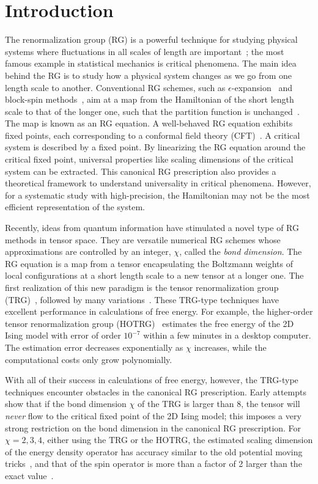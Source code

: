 \documentclass[aps,prr,reprint,superscriptaddress,nofootinbib,floatfix]{revtex4-2}
\begin{document}
\section{Introduction\label{intro}}
The renormalization group (RG) is a powerful technique for studying physical systems where fluctuations in all scales of length are important~\cite{wilsonNobel}; the most famous example in statistical mechanics is critical phenomena.
The main idea behind the RG is to study how a physical system changes as we go from one length scale to another.
Conventional RG schemes, such as $\epsilon$-expansion~\cite{wilson1972} and block-spin methods~\cite{kadanoff1966,kadanoff1975,migdal,kadanoff1976,niemeijer1973}, aim at a map from the Hamiltonian of the short length scale to that of the longer one, such that the partition function is unchanged~\cite{nonlinearRG}.
The map is known as an RG equation. 
A well-behaved RG equation exhibits fixed points, each corresponding to a conformal field theory (CFT)~\cite{polchinski1988,nakayama2015}.
A critical system is described by a fixed point.
By linearizing the RG equation around the critical fixed point, universal properties like scaling dimensions of the critical system can be extracted.
This canonical RG prescription also provides a theoretical framework to understand universality in critical phenomena.
However, for a systematic study with high-precision, the Hamiltonian may not be the most efficient representation of the system.
%

Recently, ideas from quantum information have stimulated a novel type of RG methods in tensor space.
They are versatile numerical RG schemes whose approximations are controlled by an integer, $\chi$, called the \textit{bond dimension}.
The RG equation is a map from a tensor encapsulating the Boltzmann weights of local configurations at a short length scale to a new tensor at a longer one.
The first realization of this new paradigm is the tensor renormalization group (TRG)~\cite{trg}, followed by many variations~\cite{SRGa,SRGb,hotrg,atrg, triadtrg,morita2020global}.
These TRG-type techniques have excellent performance in calculations of free energy. 
For example, the higher-order tensor renormalization group (HOTRG)~\cite{hotrg} estimates the free energy of the 2D Ising model with error of order $10^{-7}$ within a few minutes in a desktop computer.
The estimation error decreases exponentially as $\chi$ increases, while the computational costs only grow polynomially.
%

With all of their success in calculations of free energy, however, the TRG-type techniques encounter obstacles in the canonical RG prescription. 
Early attempts~\cite{Berker2008,aoki2009,meurice2013,kadanoff2014} show that if the bond dimension $\chi$ of the TRG is larger than 8, the tensor will \textit{never} flow to the critical fixed point of the 2D Ising model; this imposes a very strong restriction on the bond dimension in the canonical RG prescription.
For $\chi = 2, 3, 4$, either using the TRG or the HOTRG, the estimated scaling dimension of the energy density operator has accuracy similar to the old potential moving tricks~\cite{Berker2008,aoki2009,meurice2013}, and that of the spin operator is more than a factor of 2 larger than the exact value~\cite{kadanoff2014}.
%
\end{document}
